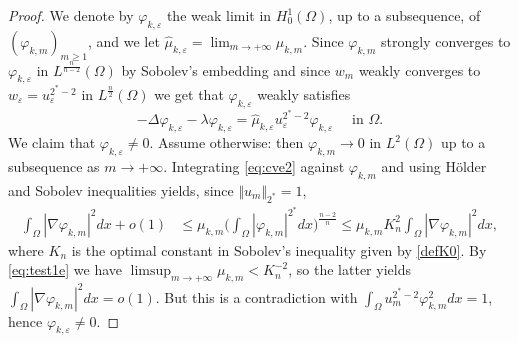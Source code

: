\documentclass[10pt,a4paper]{amsart}
\newcommand{\Om}{\Omega}
\newcommand{\ve}{\varepsilon}
\newcommand{\vp}{\varphi}
\begin{document}
\begin{proof}
We denote by $\vp_{k,\ve}$ the weak limit in $H^1_0(\Om)$, up to a subsequence, of $( \vp_{k,m} )_{m \ge 1}$, and we let $\hat{\mu}_{k,\ve} = \lim_{m \to +\infty} \mu_{k,m}$. Since $\vp_{k,m}$ strongly converges to $\vp_{k,\ve}$ in $L^\frac{n}{n-2}(\Om)$ by Sobolev's embedding and since $w_m$ weakly converges to $w_\ve = u_\ve^{2^*-2}$ in $L^{\frac{n}{2}}(\Om)$ we get that $\vp_{k,\ve}$ weakly satisfies
 \begin{equation} \label{eq:cve4}
  - \Delta \vp_{k,\ve} - \lambda \vp_{k,\ve} = \hat{\mu}_{k,\ve}  u_\ve^{2^*-2}\vp_{k,\ve} \quad \text{ in } \Om. 
 \end{equation}
We claim that $\vp_{k,\ve} \neq 0$. Assume otherwise: then $\vp_{k,m} \to 0$ in $L^2(\Om)$ up to a subsequence as $m \to + \infty$. Integrating \eqref{eq:cve2} against $\vp_{k,m}$ and using H\"older and Sobolev inequalities yields, since $\Vert u_m \Vert_{2^*} = 1$,
$$ \begin{aligned} \int_{\Om} |\nabla \vp_{k,m}|^2dx + o(1) & \le \mu_{k,m} \big( \int_{\Om} |\vp_{k,m}|^{2^*}dx \big)^{\frac{n-2}{n}}  \le \mu_{k,m}K_n^2  \int_{\Om} |\nabla \vp_{k,m}|^2dx, \end{aligned} $$
where $K_n$ is the optimal constant in Sobolev's inequality given by \eqref{defK0}. By \eqref{eq:test1e} we have $\limsup_{m \to  + \infty} \mu_{k,m} < K_n^{-2}$, so the latter yields $\int_{\Om} |\nabla \vp_{k,m}|^2 dx = o(1)$. But this is a contradiction with $\int_{\Om} u_m^{2^*-2} \vp_{k,m}^2dx = 1$, hence $\vp_{k,\ve} \neq 0$. 



\end{proof}
\end{document}

